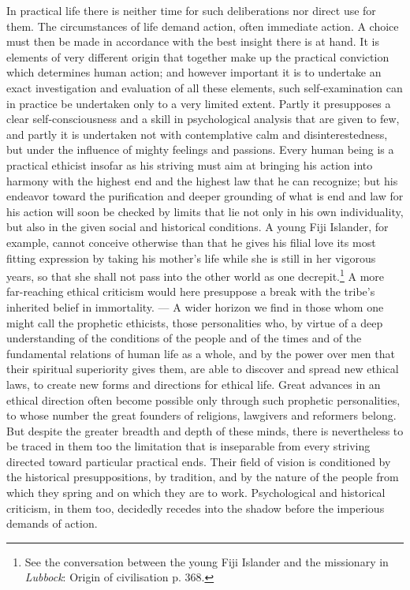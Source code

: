 \documentclass[12pt,a4paper,openany]{book}
\newcommand{\opage}[1]{\marginnote{\footnotesize\textit{[#1]}}}
\begin{document}
In practical life there is neither time for such deliberations nor direct
use for them. The circumstances of life demand action, often immediate
action. A choice must then be made in accordance with the best insight
there is at hand. It is elements of very different origin that together
make up the practical conviction which determines human action; and however
important it is to undertake an exact investigation and evaluation of all
these elements, such self-examination can in practice be undertaken only to
a very limited extent. Partly it presupposes a clear self-consciousness and
a skill in psychological analysis that are given to few, and partly it is
undertaken not with contemplative calm and disinterestedness, but under the
influence of mighty feelings and passions. Every human being is a practical
ethicist insofar as his striving must aim at bringing his action into
harmony with the highest end and the highest law that he can recognize; but
his endeavor toward the purification and deeper grounding of what is end and
law for his \opage{3}action will soon be checked by limits that lie not only
in his own individuality, but also in the given social and historical
conditions. A young Fiji Islander, for example, cannot conceive otherwise
than that he gives his filial love its most fitting expression by taking his
mother's life while she is still in her vigorous years, so that she shall
not pass into the other world as one decrepit.\footnote[1]{See the
conversation between the young Fiji Islander and the missionary in
\emph{Lubbock}: Origin of civilisation p. 368.} A more far-reaching ethical
criticism would here presuppose a break with the tribe's inherited belief in
immortality. --- A wider horizon we find in those whom one might call the
prophetic ethicists, those personalities who, by virtue of a deep
understanding of the conditions of the people and of the times and of the
fundamental relations of human life as a whole, and by the power over men
that their spiritual superiority gives them, are able to discover and spread
new ethical laws, to create new forms and directions for ethical life. Great
advances in an ethical direction often become possible only through such
prophetic personalities, to whose number the great founders of religions,
lawgivers and reformers belong. But despite the greater breadth and depth of
these minds, there is nevertheless to be traced in them too the limitation
that is inseparable from every striving directed toward particular practical
ends. Their field of vision is conditioned by the historical presuppositions,
by tradition, and by the nature of the people from which they spring and on
which they are to work. Psychological and historical criticism, in them too,
decidedly recedes into the shadow before the imperious demands of action.
\end{document}
